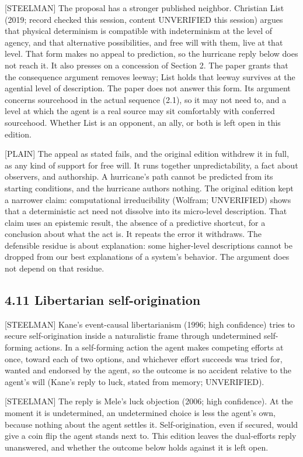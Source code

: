 \documentclass[11pt]{article}
\newcommand{\register}[1]{{\ttfamily\small #1}}
\begin{document}
\register{[STEELMAN]} The proposal has a stronger published neighbor. Christian List (2019; record checked this session, content UNVERIFIED this session) argues that physical determinism is compatible with indeterminism at the level of agency, and that alternative possibilities, and free will with them, live at that level. That form makes no appeal to prediction, so the hurricane reply below does not reach it. It also presses on a concession of Section 2. The paper grants that the consequence argument removes leeway; List holds that leeway survives at the agential level of description. The paper does not answer this form. Its argument concerns sourcehood in the actual sequence (2.1), so it may not need to, and a level at which the agent is a real source may sit comfortably with conferred sourcehood. Whether List is an opponent, an ally, or both is left open in this edition.

\register{[PLAIN]} The appeal as stated fails, and the original edition withdrew it in full, as any kind of support for free will. It runs together unpredictability, a fact about observers, and authorship. A hurricane's path cannot be predicted from its starting conditions, and the hurricane authors nothing. The original edition kept a narrower claim: computational irreducibility (Wolfram; UNVERIFIED) shows that a deterministic act need not dissolve into its micro-level description. That claim uses an epistemic result, the absence of a predictive shortcut, for a conclusion about what the act is. It repeats the error it withdraws. The defensible residue is about explanation: some higher-level descriptions cannot be dropped from our best explanations of a system's behavior. The argument does not depend on that residue.

\subsection*{4.11 Libertarian self-origination}

\register{[STEELMAN]} Kane's event-causal libertarianism (1996; high confidence) tries to secure self-origination inside a naturalistic frame through undetermined self-forming actions. In a self-forming action the agent makes competing efforts at once, toward each of two options, and whichever effort succeeds was tried for, wanted and endorsed by the agent, so the outcome is no accident relative to the agent's will (Kane's reply to luck, stated from memory; UNVERIFIED).

\register{[STEELMAN]} The reply is Mele's luck objection (2006; high confidence). At the moment it is undetermined, an undetermined choice is less the agent's own, because nothing about the agent settles it. Self-origination, even if secured, would give a coin flip the agent stands next to. This edition leaves the dual-efforts reply unanswered, and whether the outcome below holds against it is left open.
\end{document}
